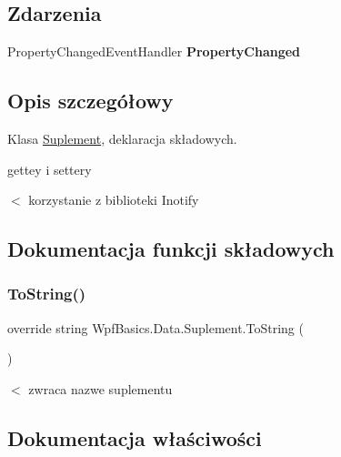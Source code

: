 \subsection*{Zdarzenia}
\begin{DoxyCompactItemize}
\item 
\mbox{\label{class_wpf_basics_1_1_data_1_1_suplement_a3d338f2485c6b68e4348a89996e8483d}} 
Property\+Changed\+Event\+Handler {\bfseries Property\+Changed}
\end{DoxyCompactItemize}


\subsection{Opis szczegółowy}
Klasa \hyperlink{class_wpf_basics_1_1_data_1_1_suplement}{Suplement}, deklaracja składowych. 

gettey i settery

$<$ korzystanie z biblioteki Inotify 

\subsection{Dokumentacja funkcji składowych}
\mbox{\label{class_wpf_basics_1_1_data_1_1_suplement_a1c5a542a7eb2698f1f6cf1d2ea6faa9f}} 
\subsubsection{\texorpdfstring{To\+String()}{ToString()}}
{\footnotesize\ttfamily override string Wpf\+Basics.\+Data.\+Suplement.\+To\+String (\begin{DoxyParamCaption}{ }\end{DoxyParamCaption})}

$<$ zwraca nazwe suplementu 

\subsection{Dokumentacja właściwości}
\mbox{\label{class_wpf_basics_1_1_data_1_1_suplement_a020da06c09bf65ffcd1de13550426708}} 
